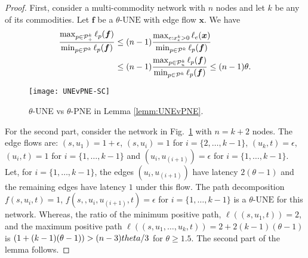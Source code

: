 \begin{proof}
First, consider a multi-commodity network with $n$ nodes and let  $k$ be any of its commodities. Let $\bm{f}$ be a $\theta\text{-UNE}$ with edge flow $\bm{x}$. We have 
\begin{align*}
\frac{\max_{p\in \mathcal{P}^k_{+}}\ell_p(\bm{f})}{\min_{p\in \mathcal{P}^k}\ell_p(\bm{f})} 
&\leq (n-1)\frac{\max_{e: x_e^k >0} \ell_e(\bm{x})}{\min_{p\in \mathcal{P}^k} \ell_p(\bm{f})} \\
&\leq (n-1)\frac{\max_{p\in \mathcal{P}^k_{u}}\ell_p(\bm{f})}{\min_{p\in \mathcal{P}^k}\ell_p(\bm{f})} \leq (n-1)\theta.
\end{align*} 

\begin{figure}
\centering
\texttt{[image: UNEvPNE-SC]}
\caption{$\theta$-UNE vs $\theta$-PNE in Lemma \ref{lemm:UNEvPNE}.}
\label{fig:UNEvPNE-SC}
\end{figure}

For the second part, consider the network in Fig.~\ref{fig:UNEvPNE-SC} with $n=k+2$ nodes. The edge flows are: $(s,u_1) = 1+\epsilon$, $(s,u_i)=1$ for $i=\{2,\dots, k-1\}$, $(u_k,t) = \epsilon$, $(u_i,t) = 1$ for  $i=\{1,\dots, k-1\}$ and $(u_i,u_{(i+1)}) = \epsilon$ for  $i=\{1,\dots, k-1\}$. Let, for  $i=\{1,\dots, k-1\}$, the edges $(u_i,u_{(i+1)})$ have latency $2(\theta - 1)$ and the remaining edges have latency $1$ under this flow.  The path decomposition $f(s,u_i,t)= 1$, $f(s,,u_i, u_{(i+1)},t)= \epsilon$ for  $i=\{1,\dots, k-1\}$ is a $\theta\text{-UNE}$ for this network. Whereas, the ratio of the minimum positive path,  $\ell((s,u_1,t))= 2$, and the maximum positive path $\ell((s,u_1,\dots, u_k, t))= 2+2(k-1)(\theta-1)$ is $\left(1+(k-1)(\theta -1)\right) > (n-3)\\theta/3$ for $\theta \geq 1.5$. The second part of the lemma follows.



\end{proof}

